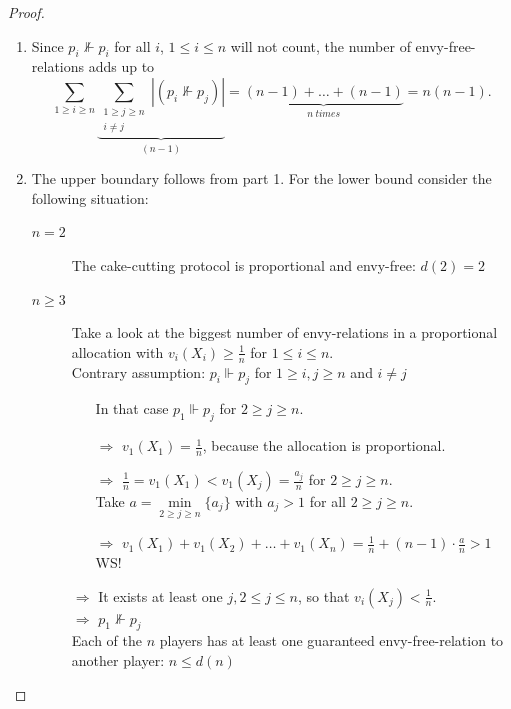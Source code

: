 \begin{proof}
 \begin{enumerate}
  \item Since $p_i\nVdash p_i$ for all $i$, $1\leq i\leq n$ will not count, the number of envy-free-relations adds up to $$\sum\limits_{1 \geq i \geq n} \underbrace{\sum\limits_{\substack{{1 \geq j \geq n}\\{i \neq j}}} |(p_i \nVdash p_j)|}_{(n-1)}= \underbrace{(n-1)+ \dots +(n-1)}_{n\:times}=n(n-1).$$
  \item The upper boundary follows from part 1. For the lower bound consider the following situation:
  \begin{description}
         \item[$n=2$] The cake-cutting protocol is proportional and envy-free: $d(2)=2$ 
                 \item[$n\geq3$] Take a look at the biggest number of envy-relations in a proportional allocation with $v_i(X_i)\geq\frac{1}{n}$ for $1\leq i\leq n$.\\
                 \newline
                 		 Contrary assumption: $p_i\Vdash p_j$ for $1 \geq i,j \geq n$ and $i \neq j$
                 		 \begin{itemize}
                 		 \item[] In that case $p_1\Vdash p_j$ for $2 \geq j \geq n$.
                          \item[$\Rightarrow$]$v_1(X_1)=\frac{1}{n}$, because the allocation is proportional.
                          \item[$\Rightarrow$]$\frac{1}{n} = v_1(X_1) < v_1(X_j)=\frac{a_j}{n}$ for $2 \geq j \geq n$.\\Take $a= \min\limits_{2 \geq j \geq n} \{a_j\}$ with $a_j>1$ for all $2 \geq j \geq n$.
                          \item[$\Rightarrow$]$ v_1(X_1)+v_1(X_2)+ \dots + v_1(X_n)=\frac{1}{n}+(n-1)\cdot \frac{a}{n} >1 $ WS!
                          \end{itemize}
                          $\Rightarrow$ It exists at least one $j,2\leq j\leq n$, so that $v_i(X_j)<\frac{1}{n}$.\\
                          $\Rightarrow$ $p_1\nVdash p_j$\\
                         Each of the $n$ players has at least one guaranteed envy-free-relation to another player: $n\leq d(n)$  
        \end{description}
 \end{enumerate}
\end{proof}
